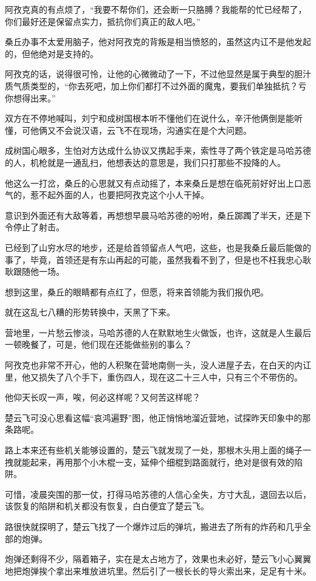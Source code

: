 阿孜克真的有点烦了，“我要不帮你们，还会断一只胳膊？我能帮的忙已经帮了，你们最好还是保留点实力，抵抗你们真正的敌人吧。”

桑丘办事不太爱用脑子，他对阿孜克的背叛是相当愤怒的，虽然这内讧不是他发起的，但他绝对是支持的。

阿孜克的话，说得很可怜，让他的心微微动了一下，不过他显然是属于典型的胆汁质气质类型的，“你去死吧，加上你们都打不过外面的魔鬼，要我们单独抵抗？亏你想得出来。”

双方在不停地喊叫，刘宁和成树国根本听不懂他们在说什么，辛汗他俩倒是能听懂，可他俩又不会说汉语，云飞不在现场，沟通实在是个大问题。

成树国心眼多，生怕对方达成什么协议又携起手来，索性寻了两个铁定是马哈苏德的人，机枪就是一通乱扫，他想表达的意思是，我们只打那些不投降的人。

他这么一打岔，桑丘的心思就又有点动摇了，本来桑丘是想在临死前好好出上口恶气的，惹不起外面的人，也要把阿孜克这个小人干掉。

意识到外面还有大敌等着，再想想早晨马哈苏德的吩咐，桑丘踯躅了半天，还是下令停止了射击。

已经到了山穷水尽的地步，还是给首领留点人气吧，这些，也是我桑丘最后能做的事了，毕竟，首领还是有东山再起的可能，虽然我看不到了，但是也不枉我忠心耿耿跟随他一场。

想到这里，桑丘的眼睛都有点红了，但愿，将来首领能为我们报仇吧。

就在这乱七八糟的形势转换中，天黑了下来。

营地里，一片愁云惨淡，马哈苏德的人在默默地生火做饭，也许，这就是人生最后一顿晚餐了，可是，他们现在还能做些别的事么？

阿孜克也非常不开心，他的人积聚在营地南侧一头，没人进屋子去，在白天的内讧里，他又损失了八个手下，重伤四人，现在这二十三人中，只有三个不带伤的。

他仰天长叹一声，唉，何必这样呢？又何苦这样呢？

楚云飞可没心思看这幅“哀鸿遍野”图，他正悄悄地溜近营地，试探昨天印象中的那条路呢。

路上本来还有些机关能够设置的，楚云飞就发现了一处，那根木头用上面的绳子一拽就能起来，再用那个小木棍一支，延伸个细棍到路面就行，绝对是很有效的陷阱。

可惜，凌晨突围的那一仗，打得马哈苏德的人信心全失，方寸大乱，退回去以后，该恢复的陷阱和机关都没有恢复，白白便宜了楚云飞。

路很快就探明了，楚云飞找了一个爆炸过后的弹坑，搬进去了所有的炸药和几乎全部的炮弹。

炮弹还剩得不少，隔着箱子，实在是太占地方了，效果也未必好，楚云飞小心翼翼地把炮弹挨个拿出来堆放进坑里。然后引了一根长长的导火索出来，足足有十米。

